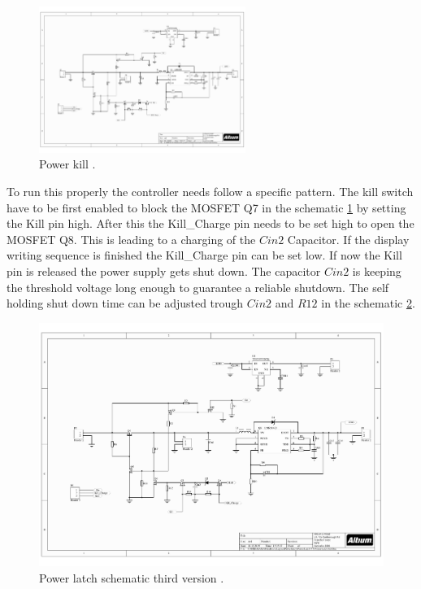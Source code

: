  \begin{figure}[ht]
	\centering
	\includegraphics[clip, trim=10.5cm 4cm 12cm 13cm, width=0.6\textwidth]{4-development/hardware/graphics/PowerLatch/PwrLatch_V3_sch.pdf}
	\caption{Power kill .\label{development:kill}}
\end{figure}

To run this properly the controller needs follow a specific pattern. The kill switch have to be first enabled to block the MOSFET Q7 in the schematic \ref{development:kill} by setting the Kill pin high. After this the Kill\_Charge pin needs to be set high to open the MOSFET Q8. This is leading to a charging of the $Cin2$ Capacitor. If the display writing sequence is finished the Kill\_Charge pin can be set low. If now the Kill pin is released the power supply gets shut down. The capacitor $Cin2$ is keeping the threshold voltage long enough to guarantee a reliable shutdown. The self holding shut down time can be adjusted trough $Cin2$ and $R12$ in the schematic \ref{development:scematicV3}.   

\begin{figure}[ht]
 	\centering
 	\includegraphics[clip, trim=4cm 4cm 1cm 5cm, width=1\textwidth]{4-development/hardware/graphics/PowerLatch/PwrLatch_V3_sch.pdf}
 	\caption{Power latch schematic third version .\label{development:scematicV3}}
\end{figure}


